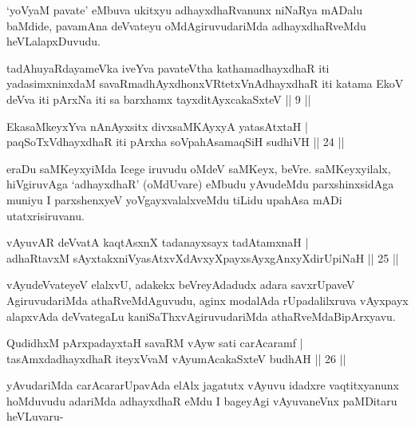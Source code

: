 \begin{artha}%
`yoV\s yaM pavate' eMbuva ukitxyu adhayxdhaRvanunx niNaRya mADalu baMdide, pavamAna deVvateyu oMdAgiruvudariMda adhayxdhaRveMdu heVLalapxDuvudu.
\end{artha}


\begin{kandikeshl}
tadAhuyaRdayameVka iveYva pavateV\s tha kathamadhayxdhaR iti yadasimxninxdaM savaRmadhAyxdhonxVRtetxVnAdhayxdhaR iti katama EkoV deVva iti pArxNa iti sa barxhamx tayxditAyxcakaSxteV || 9 ||
\end{kandikeshl}


\begin{shl}
EkasaMkeyxYva nAnAyx\s sitx divxsaMKAyxyA yatasAtxtaH |\\
paqSoTxV\s dhayxdhaR iti pArxha soVpahAsamaqSiH sudhiVH \hfill || 24 ||
\end{shl}

\begin{artha}
eraDu saMKeyxyiMda Icege iruvudu oMdeV saMKeyx, beVre. saMKeyxyilalx, hiVgiruvAga `adhayxdhaR' (oMdUvare) eMbudu yAvudeMdu parxshinxsidAga muniyu I parxshenxyeV yoVgayxvalalxveMdu tiLidu upahAsa mADi utatxrisiruvanu.
\end{artha}

\begin{shl}
vAyuvAR deVvatA kaqtAsxnX tadanayxsayx tadAtamxnaH |\\
adhaRtavxM sAyxtakxniVyasAtxvXdAvxyXpayxsAyxgAnxyXdirUpiNaH \hfill || 25 ||
\end{shl}

\begin{artha}
vAyudeVvateyeV elalxvU, adakekx beVreyAdadudx adara savxrUpaveV AgiruvudariMda athaRveMdAguvudu, aginx modalAda rUpadalilxruva vAyxpayx alapxvAda deVvategaLu kaniSaThxvAgiruvudariMda athaRveMdaBipArxyavu.
\end{artha}


\begin{shl}
QudidhxM pArxpadayxtaH savaRM vAyw sati carAcaramf |\\
tasAmxdadhayxdhaR iteyxVvaM vAyumAcakaSxteV budhAH \hfill || 26 ||
\end{shl}

\begin{artha}
yAvudariMda carAcararUpavAda elAlx jagatutx vAyuvu idadxre vaqtitxyanunx hoMduvudu adariMda adhayxdhaR eMdu I bageyAgi vAyuvaneVnx paMDitaru heVLuvaru-
\end{artha}

